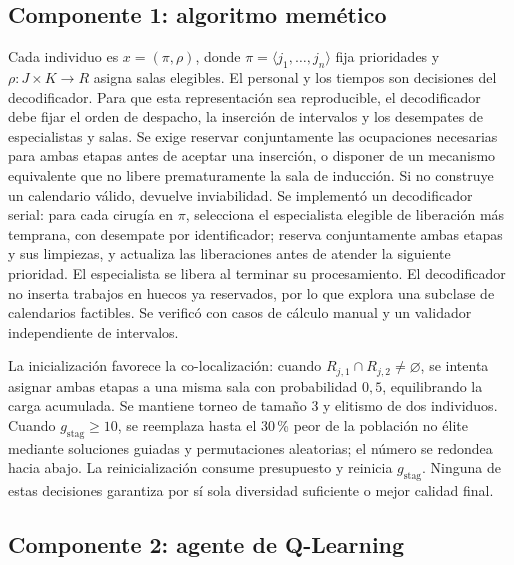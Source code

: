 \documentclass[11pt,a4paper]{article}
\newcommand{\gstag}{g_{\mathrm{stag}}}
\begin{document}
\subsection{Componente 1: algoritmo memético}
Cada individuo es $x=(\pi,\rho)$, donde $\pi=\langle j_1,\ldots,j_n\rangle$ fija prioridades y $\rho:J\times K\to R$ asigna salas elegibles. El personal y los tiempos son decisiones del decodificador. Para que esta representación sea reproducible, el decodificador debe fijar el orden de despacho, la inserción de intervalos y los desempates de especialistas y salas. Se exige reservar conjuntamente las ocupaciones necesarias para ambas etapas antes de aceptar una inserción, o disponer de un mecanismo equivalente que no libere prematuramente la sala de inducción. Si no construye un calendario válido, devuelve inviabilidad. Se implementó un decodificador serial: para cada cirugía en $\pi$, selecciona el especialista elegible de liberación más temprana, con desempate por identificador; reserva conjuntamente ambas etapas y sus limpiezas, y actualiza las liberaciones antes de atender la siguiente prioridad. El especialista se libera al terminar su procesamiento. El decodificador no inserta trabajos en huecos ya reservados, por lo que explora una subclase de calendarios factibles. Se verificó con casos de cálculo manual y un validador independiente de intervalos.

La inicialización favorece la co-localización: cuando $R_{j,1}\cap R_{j,2}\ne\varnothing$, se intenta asignar ambas etapas a una misma sala con probabilidad $0{,}5$, equilibrando la carga acumulada. Se mantiene torneo de tamaño 3 y elitismo de dos individuos. Cuando $\gstag\geq10$, se reemplaza hasta el 30\,\% peor de la población no élite mediante soluciones guiadas y permutaciones aleatorias; el número se redondea hacia abajo. La reinicialización consume presupuesto y reinicia $\gstag$. Ninguna de estas decisiones garantiza por sí sola diversidad suficiente o mejor calidad final.

\subsection{Componente 2: agente de Q-Learning}
\end{document}
